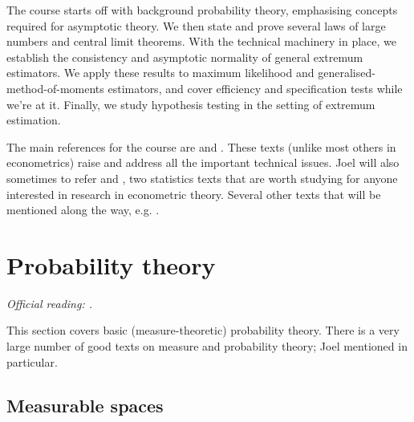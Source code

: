 \documentclass[11pt,letterpaper,reqno,oneside]{article}
\begin{document}
The course starts off with background probability theory, emphasising concepts required for asymptotic theory. We then state and prove several laws of large numbers and central limit theorems. With the technical machinery in place, we establish the consistency and asymptotic normality of general extremum estimators. We apply these results to maximum likelihood and generalised-method-of-moments estimators, and cover efficiency and specification tests while we're at it. Finally, we study hypothesis testing in the setting of extremum estimation.

The main references for the course are \textcite{Amemiya1985} and \textcite{NeweyMcfadden1994}. These texts (unlike most others in econometrics) raise and address all the important technical issues. Joel will also sometimes to refer \textcite{Rao1973} and \textcite{Serfling1980}, two statistics texts that are worth studying for anyone interested in research in econometric theory. Several other texts that will be mentioned along the way, e.g. \textcite{White2001}.



\pagebreak
\section{Probability theory}
\label{sec:probability}

\emph{%
Official reading: \textcite[][ch. 2]{Rao1973}.}

This section covers basic (measure-theoretic) probability theory. There is a very large number of good texts on measure and probability theory; Joel mentioned \textcite{KolmogorovFomin1975} in particular.



\subsection{Measurable spaces}
\label{sec:probability:measurable_spaces}
\end{document}

